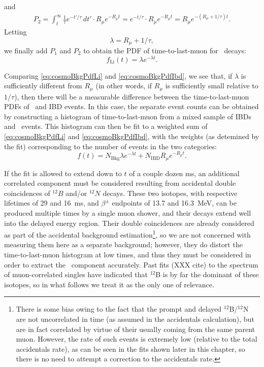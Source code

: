 \documentclass[../thesis.tex]{subfiles}
\begin{document}
and
\begin{align*}
  P_2 = \int_t^\infty \frac{1}{\tau}e^{-t'/\tau}\,dt' \cdot R_\mu e^{-R_\mu t} = e^{-t/\tau} \cdot R_\mu e^{-R_\mu t} = R_\mu e^{-(R_\mu + 1/\tau)t}.
\end{align*}
Letting
\begin{equation*}
  \lambda = R_\mu + 1/\tau,
\end{equation*}
we finally add $P_1$ and $P_2$ to obtain the PDF of time-to-last-muon for \linine\ decays:
\begin{equation}
  \label{eq:cosmoBkgPdfLi}
  f_{\mathrm{Li}}(t) = \lambda e^{-\lambda t}.
\end{equation}

Comparing \autoref{eq:cosmoBkgPdfLi} and \autoref{eq:cosmoBkgPdfIbd}, we see that, if $\lambda$ is sufficiently different from $R_\mu$ (in other words, if $R_\mu$ is sufficiently small relative to $1/\tau$), then there will be a measurable difference between the time-to-last-muon PDFs of \linine\ and IBD events. In this case, the separate event counts can be obtained by constructing a histogram of time-to-last-muon from a mixed sample of IBDs and \linine\ events. This histogram can then be fit to a weighted sum of \autoref{eq:cosmoBkgPdfLi} and \autoref{eq:cosmoBkgPdfIbd}, with the weights (as detemined by the fit) corresponding to the number of events in the two categories:
\begin{equation*}
  f(t) = N_{\mathrm{Bkg}} \lambda e^{-\lambda t} + N_{\mathrm{IBD}} R_\mu e^{-R_\mu t}.
\end{equation*}

If the fit is allowed to extend down to $t$ of a couple dozen ms, an additional correlated component must be considered resulting from accidental double coincidences of $^{12}B$ and/or $^{12}N$ decays. These two isotopes, with respective lifetimes of 29 and 16~ms, and $\beta^\pm$ endpoints of 13.7 and 16.3~MeV, can be produced multiple times by a single muon shower, and their decays extend well into the delayed energy region. Their double coincidences are already considered as part of the accidental background estimation\footnote{There is some bias owing to the fact that the prompt and delayed $^{12}$B/$^{12}$N are not uncorrelated in time (as assumed in the accidentals calculation), but are in fact correlated by virtue of their usually coming from the same parent muon. However, the rate of such events is extremely low (relative to the total accidentals rate), as can be seen in the fits shown later in this chapter, so there is no need to attempt a correction to the accidentals rate.}, so we are not concerned with measuring them here as a separate background; however, they do distort the time-to-last-muon histogram at low times, and thus they must be considered in order to extract the \linine\ component accurately. Past fits (XXX cite) to the spectrum of muon-correlated singles have indicated that $^{12}$B is by far the dominant of these isotopes, so in what follows we treat it as the only one of relevance.
\end{document}

